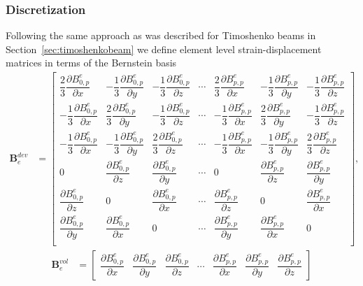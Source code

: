\documentclass{article}
\begin{document}
\subsubsection{Discretization}
Following the same approach as was described for Timoshenko beams in Section~\ref{sec:timoshenkobeam} we define element level strain-displacement matrices in terms of the Bernstein basis 
\begin{align}
\mathbf{B}^{dev}_e&=
\begin{bmatrix}
\dfrac{2}{3}\dfrac{\partial{B}^e_{0,p}}{\partial{x}} & -\dfrac{1}{3}\dfrac{\partial{B}^e_{0,p}}{\partial{y}} & -\dfrac{1}{3}\dfrac{\partial{B}^e_{0,p}}{\partial{z}} & \cdots & \dfrac{2}{3}\dfrac{\partial{B}^e_{p,p}}{\partial{x}} & -\dfrac{1}{3}\dfrac{\partial{B}^e_{p,p}}{\partial{y}} & -\dfrac{1}{3}\dfrac{\partial{B}^e_{p,p}}{\partial{z}} \\
-\dfrac{1}{3}\dfrac{\partial{B}^e_{0,p}}{\partial{x}}  & \dfrac{2}{3}\dfrac{\partial{B}^e_{0,p}}{\partial{y}} & -\dfrac{1}{3}\dfrac{\partial{B}^e_{0,p}}{\partial{z}} & \cdots & -\dfrac{1}{3}\dfrac{\partial{B}^e_{p,p}}{\partial{x}}  & \dfrac{2}{3}\dfrac{\partial{B}^e_{p,p}}{\partial{y}} & -\dfrac{1}{3}\dfrac{\partial{B}^e_{p,p}}{\partial{z}}\\
-\dfrac{1}{3}\dfrac{\partial{B}^e_{0,p}}{\partial{x}} & -\dfrac{1}{3}\dfrac{\partial{B}^e_{0,p}}{\partial{y}} & \dfrac{2}{3}\dfrac{\partial{B}^e_{0,p}}{\partial{z}} & \cdots & -\dfrac{1}{3}\dfrac{\partial{B}^e_{p,p}}{\partial{x}} & -\dfrac{1}{3}\dfrac{\partial{B}^e_{p,p}}{\partial{y}} & \dfrac{2}{3}\dfrac{\partial{B}^e_{p,p}}{\partial{z}}\\
0 & \dfrac{\partial{B}^e_{0,p}}{\partial{z}} & \dfrac{\partial{B}^e_{0,p}}{\partial{y}} & \cdots & 0 & \dfrac{\partial{B}^e_{p,p}}{\partial{z}} & \dfrac{\partial{B}^e_{p,p}}{\partial{y}}\\
\dfrac{\partial{B}^e_{0,p}}{\partial{z}} & 0 & \dfrac{\partial{B}^e_{0,p}}{\partial{x}} & \cdots & \dfrac{\partial{B}^e_{p,p}}{\partial{z}} & 0 & \dfrac{\partial{B}^e_{p,p}}{\partial{x}}\\
\dfrac{\partial{B}^e_{0,p}}{\partial{y}} & \dfrac{\partial{B}^e_{0,p}}{\partial{x}} & 0 & \cdots & \dfrac{\partial{B}^e_{p,p}}{\partial{y}} & \dfrac{\partial{B}^e_{p,p}}{\partial{x}} & 0\\
\end{bmatrix},
\end{align}
\begin{align}
\mathbf{B}_e^{vol}&=
\begin{bmatrix}
\dfrac{\partial{B}^e_{0,p}}{\partial{x}} & \dfrac{\partial{B}^e_{0,p}}{\partial{y}} & \dfrac{\partial{B}^e_{0,p}}{\partial{z}} & \cdots & \dfrac{\partial{B}^e_{p,p}}{\partial{x}} & \dfrac{\partial{B}^e_{p,p}}{\partial{y}} & \dfrac{\partial{B}^e_{p,p}}{\partial{z}}
\end{bmatrix}
\end{align}
\end{document}
